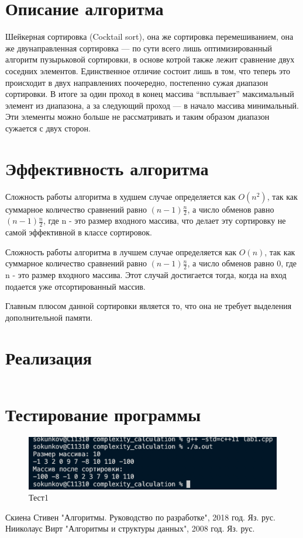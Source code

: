 \documentclass[spec, och, labwork]{shiza}
\begin{document}
\tableofcontents

\section{Описание алгоритма}

Шейкерная сортировка (Cocktail sort), она же сортировка перемешиванием, она же двунаправленная 
сортировка — по сути всего лишь оптимизированный алгоритм пузырьковой сортировки, в основе котрой
также лежит сравнение двух соседних элементов. Единственное отличие состоит лишь в том, что теперь 
это происходит в двух направлениях поочередно, постепенно сужая диапазон сортировки. В итоге за один 
проход в конец массива “всплывает” максимальный элемент из диапазона, а за следующий проход — в начало 
массива минимальный. Эти элементы можно больше не рассматривать и таким образом диапазон сужается с 
двух сторон.
\section{Эффективность алгоритма}

Сложность работы алгоритма в худшем случае определяется как $O(n^2)$, так как суммарное количество 
сравнений равно $(n - 1)\frac{n}{2}$, а число обменов равно $(n-1)\frac{n}{2}$, где n - это размер
входного массива, что делает эту сортировку не самой эффективной в классе сортировок.

Сложность работы алгоритма в лучшем случае определяется как $O(n)$, так как суммарное количество 
сравнений равно $(n - 1)\frac{n}{2}$, а число обменов равно $0$, где n - это размер входного массива.
Этот случай достигается тогда, когда на вход подается уже отсортированный массив.

Главным плюсом данной сортировки является то, что она не требует выделения дополнительной памяти.

\section{Реализация}

    \inputminted[fontsize=\small]{cpp}{lab1.cpp}

\section{Тестирование программы}

\begin{figure}[H]
    \centering      %
    \includegraphics[width=1.\textwidth]{1}
    \caption{Тест1}
    \label{fig:image1}
\end{figure}

\newpage

\begin{thebibliography}{3}
    Скиена Стивен "Алгоритмы. Руководство по разработке", 2018 год. Яз. рус.
    Нииколаус Вирт "Алгоритмы и структуры данных", 2008 год. Яз. рус.
\end{thebibliography}
\end{document}
